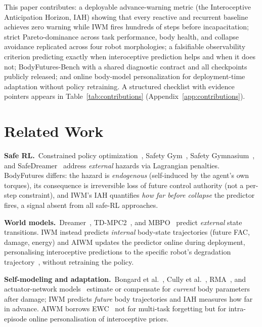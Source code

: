 \documentclass{article}
\begin{document}
This paper contributes: a deployable advance-warning metric (the Interoceptive Anticipation Horizon, IAH) showing that every reactive and recurrent baseline achieves zero warning while IWM fires hundreds of steps before incapacitation; strict Pareto-dominance across task performance, body health, and collapse avoidance replicated across four robot morphologies; a falsifiable observability criterion predicting exactly when interoceptive prediction helps and when it does not; BodyFutures-Bench with a shared diagnostic contract and all checkpoints publicly released; and online body-model personalization for deployment-time adaptation without policy retraining. A structured checklist with evidence pointers appears in Table~\ref{tab:contributions} (Appendix~\ref{app:contributions}).

\section{Related Work}
\label{sec:related}

\textbf{Safe RL.}~Constrained policy optimization~\citep{achiam2017constrained}, Safety Gym~\citep{ray2019safetygym}, Safety Gymnasium~\citep{ji2023safetygymnasium}, and SafeDreamer~\citep{huang2024safedreamer} address \emph{external} hazards via Lagrangian penalties. BodyFutures differs: the hazard is \emph{endogenous} (self-induced by the agent's own torques), its consequence is irreversible loss of future control authority (not a per-step constraint), and IWM's IAH quantifies \emph{how far before collapse} the predictor fires, a signal absent from all safe-RL approaches.

\textbf{World models.}~Dreamer~\citep{hafner2020dreamer,hafner2023dreamerv3}, TD-MPC2~\citep{hansen2023tdmpc2}, and MBPO~\citep{janner2019mbpo} predict \emph{external} state transitions. IWM instead predicts \emph{internal} body-state trajectories (future FAC, damage, energy) and AIWM updates the predictor online during deployment, personalising interoceptive predictions to the specific robot's degradation trajectory~\citep{seth2013interoceptive}, without retraining the policy.

\textbf{Self-modeling and adaptation.}~Bongard et al.~\citep{bongard2006resilient}, Cully et al.~\citep{cully2015robots}, RMA~\citep{kumar2021rma}, and actuator-network models~\citep{hwangbo2019learning} estimate or compensate for \emph{current} body parameters after damage; IWM predicts \emph{future} body trajectories and IAH measures how far in advance. AIWM borrows EWC~\citep{kirkpatrick2017overcoming} not for multi-task forgetting but for intra-episode online personalisation of interoceptive priors.
\end{document}

